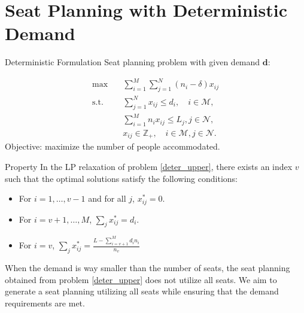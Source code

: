 
\section{Seat Planning with Deterministic Demand}
    \frame{\sectionpage}

  \begin{frame}{Deterministic Formulation}  %
    Seat planning problem with given demand $\bm{d}$:

    \begin{equation}\label{deter_upper}
      \begin{aligned}
      \max \quad & \sum_{i=1}^{M}  \sum_{j= 1}^{N} (n_i- \delta) x_{ij} \\
      \text {s.t.} \quad & \sum_{j= 1}^{N} x_{ij} \leq d_{i}, \quad i \in \mathcal{M}, \\
      & \sum_{i=1}^{M} n_{i} x_{ij} \leq L_j, j \in \mathcal{N}, \\
      & x_{ij} \in \mathbb{Z}_{+}, \quad i \in \mathcal{M}, j \in \mathcal{N}.
      \end{aligned}
    \end{equation}
    Objective: maximize the number of people accommodated.
  \end{frame}

  \begin{frame}{Property}
    In the LP relaxation of problem \eqref{deter_upper}, there exists an index $v$ such that the optimal solutions satisfy the following conditions:

    \begin{itemize}
      \item For $i = 1,\ldots, v-1$ and for all $j$, $x_{ij}^{*} = 0$. 
      \item For $i = v+1,\ldots, M$, $\sum_{j} x_{ij}^{*} = d_{i}$. 

      \item For $i = v$, $\sum_{j} x_{ij}^{*} = \frac{L - \sum_{i = v+1}^{M} {d_i n_i}}{n_v}$ 
    \end{itemize}

    When the demand is way smaller than the number of seats, the seat planning obtained from problem \eqref{deter_upper} does not utilize all seats. We aim to generate a seat planning utilizing all seats while ensuring that the demand requirements are met.
  \end{frame}

